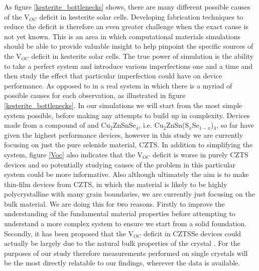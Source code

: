 As figure \ref{kesterite_bottlenecks} shows, there are many different possible causes of the  V$_{OC}$ deficit in kesterite solar cells. Developing fabrication techniques to reduce the deficit is therefore an even greater challenge when the exact cause is not yet known.
This is an area in which computational materials simulations should be able to provide valuable insight to help pinpoint the specific sources of the V$_{OC}$ deficit in kesterite solar cells. The true power of simulation is the ability to take a perfect system and introduce various imperfections one and a time and then study the effect that particular imperfection could have on device performance. As opposed to in a real system in which there is a myriad of possible causes for each observation, as illustrated in figure \ref{kesterite_bottlenecks}.
In our simulations we will start from the most simple system possible, before making any attempts to build up in complexity. Devices made from a compound of \CZTS  and Cu$_2$ZnSnSe$_4$, i.e. Cu$_2$ZnSn(S$_x$Se$_{1-x}$)$_4$, so far have given the highest performance devices, however in this study we are currently focusing on just the pure selenide material, CZTS. In addition to simplifying the system, figure \ref{Voc} also indicates that the V$_{OC}$ deficit is worse in purely CZTS devices and so potentially studying causes of the problem in this particular system could be more informative. Also although ultimately the aim is to make thin-film devices from CZTS, in which the material is likely to be highly polycrystalline with many grain boundaries, we are currently just focusing on the bulk material. We are doing this for two reasons. Firstly to improve the understanding of the fundamental material properties before attempting to understand a more complex system to ensure we start from a solid foundation. Secondly, it has been proposed that the V$_{OC}$ deficit in CZTSSe devices could actually be largely due to the natural bulk properties of the crystal \cite{culprit_5}. For the purposes of our study therefore measurements performed on single crystals will be the most directly relatable to our findings, wherever the data is available.\\

